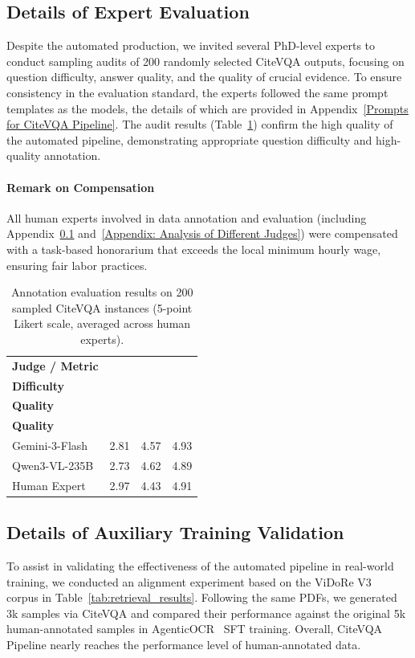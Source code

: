 \documentclass{llmxive}
\begin{document}
{{{\subsection{Details of Expert Evaluation}
\label{Appendix: Details of Expert Evaluation}
Despite the automated production, we invited several PhD-level experts to conduct sampling audits of 200 randomly selected CiteVQA outputs, focusing on question difficulty, answer quality, and the quality of crucial evidence. To ensure consistency in the evaluation standard, the experts followed the same prompt templates as the models, the details of which are provided in Appendix~\ref{Prompts for CiteVQA Pipeline}. The audit results (Table~\ref{tab:Expert Evaluation}) confirm the high quality of the automated pipeline, demonstrating appropriate question difficulty and high-quality annotation.

\paragraph{Remark on Compensation} All human experts involved in data annotation and evaluation (including Appendix~\ref{Appendix: Details of Expert Evaluation} and~\ref{Appendix: Analysis of Different Judges}) were compensated with a task-based honorarium that exceeds the local minimum hourly wage, ensuring fair labor practices.

\begin{table}[htbp]
 \centering
 \footnotesize
 \begin{tabular}{lccc}
 \toprule
 \textbf{Judge / Metric} &
 \makecell{\textbf{Question}\\ \textbf{Difficulty}} &
 \makecell{\textbf{Answer}\\ \textbf{Quality}} &
 \makecell{\textbf{Evidence}\\ \textbf{Quality}} \\
 \midrule
 Gemini-3-Flash & 2.81 & 4.57 & 4.93 \\
 Qwen3-VL-235B & 2.73 & 4.62 & 4.89 \\
 Human Expert & 2.97 & 4.43 & 4.91 \\
 \bottomrule
 \end{tabular}
\caption{Annotation evaluation results on 200 sampled CiteVQA instances (5-point Likert scale, averaged across human experts).}
\label{tab:Expert Evaluation}
\end{table}

\subsection{Details of Auxiliary Training Validation}
\label{Appendix: Auxiliary Training Validation}
To assist in validating the effectiveness of the automated pipeline in real-world training, we conducted an alignment experiment based on the ViDoRe V3~\citep{loison2026vidore} corpus in Table~\ref{tab:retrieval_results}. Following the same PDFs, we generated 3k samples via CiteVQA and compared their performance against the original 5k human-annotated samples in AgenticOCR~\citep{wang2026agenticocr} SFT training. Overall, CiteVQA Pipeline nearly reaches the performance level of human-annotated data.

}}}
\end{document}
